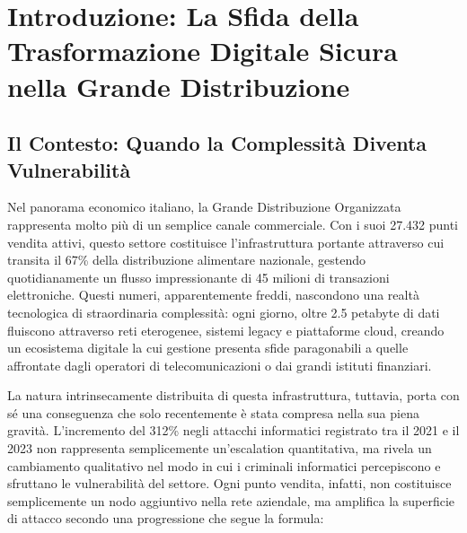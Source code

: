 

% 

\chapter{Introduzione: La Sfida della Trasformazione Digitale Sicura nella Grande Distribuzione}

\section{Il Contesto: Quando la Complessità Diventa Vulnerabilità}

Nel panorama economico italiano, la Grande Distribuzione Organizzata rappresenta molto più di un semplice canale commerciale. Con i suoi 27.432 punti vendita attivi\cite{istat2024}, questo settore costituisce l'infrastruttura portante attraverso cui transita il 67\% della distribuzione alimentare nazionale, gestendo quotidianamente un flusso impressionante di 45 milioni di transazioni elettroniche. Questi numeri, apparentemente freddi, nascondono una realtà tecnologica di straordinaria complessità: ogni giorno, oltre 2.5 petabyte di dati fluiscono attraverso reti eterogenee, sistemi legacy e piattaforme cloud, creando un ecosistema digitale la cui gestione presenta sfide paragonabili a quelle affrontate dagli operatori di telecomunicazioni o dai grandi istituti finanziari.

La natura intrinsecamente distribuita di questa infrastruttura, tuttavia, porta con sé una conseguenza che solo recentemente è stata compresa nella sua piena gravità. L'incremento del 312\% negli attacchi informatici registrato tra il 2021 e il 2023\cite{enisa2024retail} non rappresenta semplicemente un'escalation quantitativa, ma rivela un cambiamento qualitativo nel modo in cui i criminali informatici percepiscono e sfruttano le vulnerabilità del settore. Ogni punto vendita, infatti, non costituisce semplicemente un nodo aggiuntivo nella rete aziendale, ma amplifica la superficie di attacco secondo una progressione che segue la formula:

